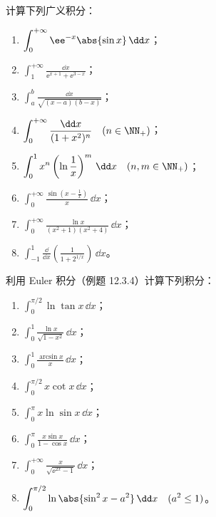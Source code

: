 \begin{xexercise}[2]
计算下列广义积分：
  \begin{enumerate}[label=(\arabic*)]
    \item $\displaystyle\int_0^{+\infty}\ee^{-x}\abs{\sin x}\,\dd x$；
    \item $\displaystyle\int_1^{+\infty}\frac{\dd x}{\ee^{x+1}+\ee^{3-x}}$；
    \item $\displaystyle\int_a^b\frac{\dd x}{\sqrt{(x-a)(b-x)}}$；
    \item $\displaystyle\int_0^{+\infty}\frac{\dd x}{(1+x^2)^n}\quad(n\in\NN_+)$；
    \item $\displaystyle\int_0^1x^n\left(\ln\frac1x\right)^m\,\dd x\quad(n,m\in\NN_+)$；
    \item $\displaystyle\int_0^{+\infty}\frac{\sin\left(x-\frac1x\right)}x\,\dd x$；
    \item $\displaystyle\int_0^{+\infty}\frac{\ln x}{(x^2+1)(x^2+4)}\,\dd x$；
    \item $\displaystyle\int_{-1}^1\frac{\dd}{\dd x}\left(\frac1{1+2^{1/x}}\right)\,\dd x$。
  \end{enumerate}
\end{xexercise}

\begin{xexercise}[3]
利用 Euler 积分（例题 12.3.4）计算下列积分：
  \begin{enumerate}[label=(\arabic*)]
    \item $\displaystyle\int_0^{\pi/2}\ln\tan x\,\dd x$；
    \item $\displaystyle\int_0^1\frac{\ln x}{\sqrt{1-x^2}}\,\dd x$；
    \item $\displaystyle\int_0^1\frac{\arcsin x}{x}\,\dd x$；
    \item $\displaystyle\int_0^{\pi/2}x\cot x\,\dd x$；
    \item $\displaystyle\int_0^\pi x\ln\sin x\,\dd x$；
    \item $\displaystyle\int_0^\pi\frac{x\sin x}{1-\cos x}\,\dd x$；
    \item $\displaystyle\int_0^{+\infty}\frac{x}{\sqrt{\ee^{2x}-1}}\,\dd x$；
    \item $\displaystyle\int_0^{\pi/2}\ln\abs{\sin^2x-a^2}\,\dd x\quad(a^2\leq1)$。
  \end{enumerate}
\end{xexercise}

